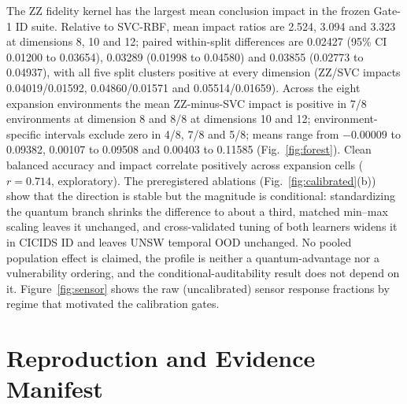 \documentclass[10pt,journal,compsoc]{IEEEtran}
\begin{document}
The ZZ fidelity kernel has the largest mean conclusion impact in the frozen
Gate-1 ID suite. Relative to SVC-RBF, mean impact ratios are 2.524, 3.094 and
3.323 at dimensions 8, 10 and 12; paired within-split differences are
0.02427 (95\% CI 0.01200 to 0.03654), 0.03289 (0.01998 to 0.04580) and
0.03855 (0.02773 to 0.04937), with all five split clusters positive at every dimension
(ZZ/SVC impacts 0.04019/0.01592, 0.04860/0.01571 and 0.05514/0.01659). Across
the eight expansion environments the mean ZZ-minus-SVC impact is positive in
7/8 environments at dimension 8 and 8/8 at dimensions 10 and 12;
environment-specific intervals exclude zero in 4/8, 7/8 and 5/8; means range
from $-0.00009$ to 0.09382, 0.00107 to 0.09508 and 0.00403 to 0.11585
(Fig.~\ref{fig:forest}). Clean balanced accuracy and impact correlate
positively across expansion cells ($r=0.714$, exploratory). The
preregistered ablations (Fig.~\ref{fig:calibrated}(b)) show that the
direction is stable but the magnitude is conditional: standardizing the
quantum branch shrinks the difference to about a third, matched min--max
scaling leaves it unchanged, and cross-validated tuning of both learners
widens it in CICIDS ID and leaves UNSW temporal OOD unchanged. No pooled
population effect is claimed, the profile is neither a quantum-advantage nor
a vulnerability ordering, and the conditional-auditability result does not
depend on it. Figure~\ref{fig:sensor} shows the raw (uncalibrated) sensor
response fractions by regime that motivated the calibration gates.

\section{Reproduction and Evidence Manifest}
\end{document}
